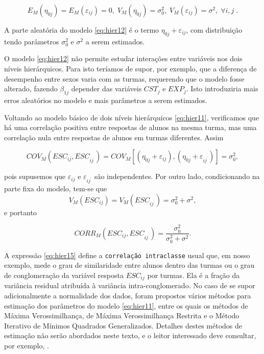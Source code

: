 \documentclass[]{book}
\theoremstyle{definition}
\theoremstyle{definition}
\theoremstyle{definition}
\theoremstyle{remark}
\begin{document}
\begin{equation}
E_{M}\left( \eta _{0j}\right) =E_{M}\left( \varepsilon _{ij}\right)
=0,\;V_{M}\left( \eta _{0j}\right) =\sigma _{0}^{2},\;V_{M}\left(
\varepsilon _{ij}\right) =\sigma ^{2},\;\forall i,j\;.  \label{eq:hier13}
\end{equation}

A parte aleatória do modelo \eqref{eq:hier12} é o termo
\(\eta _{0j}+\varepsilon _{ij}\), com distribuição tendo parâmetros
\(\sigma _{0}^{2}\) e \(\sigma ^{2}\) a serem estimados.

O modelo \eqref{eq:hier12} não permite estudar interações entre variáveis
nos dois níveis hierárquicos. Para isto teríamos de supor, por exemplo,
que a diferença de desempenho entre sexos varia com as turmas,
requerendo que o modelo fosse alterado, fazendo \(\beta _{1j}\) depender
das variáveis \(CST_{j}\) e \(EXP_{j}\). Isto introduziria mais erros
aleatórios no modelo e mais parâmetros a serem estimados.

Voltando ao modelo básico de dois níveis hierárquicos \eqref{eq:hier11},
verificamos que há uma correlação positiva entre respostas de alunos na
mesma turma, mas uma correlação nula entre respostas de alunos em turmas
diferentes. Assim

\begin{equation}
COV_{M}\left( ESC_{ij},ESC_{ij^{^{\prime }}}\right) =COV_{M}\left[ \left(
\eta _{0j}+\varepsilon _{ij}\right) ,\left( \eta _{0j}+\varepsilon
_{ij^{^{\prime }}}\right) \right] =\sigma _{0}^{2},  \label{eq:hier14}
\end{equation}

pois supusemos que \(\varepsilon _{ij}\) e
\(\varepsilon _{ij^{^{\prime }}}\) são independentes. Por outro lado,
condicionando na parte fixa do modelo, tem-se que \[
V_{M}\left( ESC_{ij}\right) =V_{M}\left( ESC_{ij^{^{\prime }}}\right)
=\sigma _{0}^{2}+\sigma ^{2}, 
\] e portanto

\begin{equation}
CORR_{M}\left( ESC_{ij},ESC_{ij^{^{\prime }}}\right) = \frac{\sigma_{0}^{2}}{\sigma _{0}^{2}+\sigma ^{2}}.  \label{eq:hier15}
\end{equation}

A expressão \eqref{eq:hier15} define a \texttt{correlação\ intraclasse}
usual que, em nosso exemplo, mede o grau de similaridade entre alunos
dentro das turmas ou o grau de conglomeração da variável resposta
\(ESC_{ij}\) por turmas. Ela é a fração da variância residual atribuída
à variância intra-conglomerado. No caso de se supor adicionalmente a
normalidade dos dados, foram propostos vários métodos para estimação dos
parâmetros do modelo \eqref{eq:hier11}, entre os quais os métodos de
Máxima Verossimilhança, de Máxima Verossimilhança Restrita e o Método
Iterativo de Mínimos Quadrados Generalizados. Detalhes destes métodos de
estimação não serão abordados neste texto, e o leitor interessado deve
consultar, por exemplo, \citep{bryk}.
\end{document}
